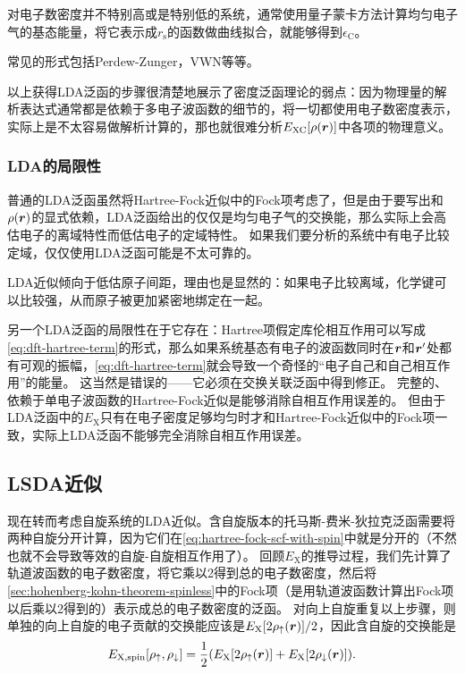 对电子数密度并不特别高或是特别低的系统，通常使用量子蒙卡方法计算均匀电子气的基态能量，将它表示成$r_\text{s}$的函数做曲线拟合，就能够得到$\epsilon_\text{C}$。

常见的形式包括Perdew-Zunger，VWN等等。

以上获得LDA泛函的步骤很清楚地展示了密度泛函理论的弱点：因为物理量的解析表达式通常都是依赖于多电子波函数的细节的，将一切都使用电子数密度表示，实际上是不太容易做解析计算的，那也就很难分析$E_\text{XC}[\rho(\vb*{r})]$中各项的物理意义。

\subsubsection{LDA的局限性}

普通的LDA泛函虽然将Hartree-Fock近似中的Fock项考虑了，但是由于要写出和$\rho(\vb*{r})$的显式依赖，LDA泛函给出的仅仅是均匀电子气的交换能，那么实际上会高估电子的离域特性而低估电子的定域特性。
如果我们要分析的系统中有电子比较定域，仅仅使用LDA泛函可能是不太可靠的。

LDA近似倾向于低估原子间距，理由也是显然的：如果电子比较离域，化学键可以比较强，从而原子被更加紧密地绑定在一起。

另一个LDA泛函的局限性在于它存在：Hartree项假定库伦相互作用可以写成\eqref{eq:dft-hartree-term}的形式，那么如果系统基态有电子的波函数同时在$\vb*{r}$和$\vb*{r}'$处都有可观的振幅，\eqref{eq:dft-hartree-term}就会导致一个奇怪的“电子自己和自己相互作用”的能量。
这当然是错误的——它必须在交换关联泛函中得到修正。
完整的、依赖于单电子波函数的Hartree-Fock近似是能够消除自相互作用误差的。
但由于LDA泛函中的$E_\text{X}$只有在电子密度足够均匀时才和Hartree-Fock近似中的Fock项一致，实际上LDA泛函不能够完全消除自相互作用误差。

\subsection{LSDA近似}

现在转而考虑自旋系统的LDA近似。含自旋版本的托马斯-费米-狄拉克泛函需要将两种自旋分开计算，因为它们在\eqref{eq:hartree-fock-scf-with-spin}中就是分开的（不然也就不会导致等效的自旋-自旋相互作用了）。
回顾$E_\text{X}$的推导过程，我们先计算了轨道波函数的电子数密度，将它乘以2得到总的电子数密度，然后将\eqref{sec:hohenberg-kohn-theorem-spinless}中的Fock项（是用轨道波函数计算出Fock项以后乘以2得到的）表示成总的电子数密度的泛函。
对向上自旋重复以上步骤，则单独的向上自旋的电子贡献的交换能应该是$E_\text{X}[2 \rho_\uparrow(\vb*{r})] / 2$，因此含自旋的交换能是
\begin{equation}
    E_\text{X,spin}[\rho_\uparrow, \rho_\downarrow] = \frac{1}{2} (E_\text{X}[2 \rho_\uparrow(\vb*{r})] + E_\text{X}[2 \rho_\downarrow(\vb*{r})]).
\end{equation}


